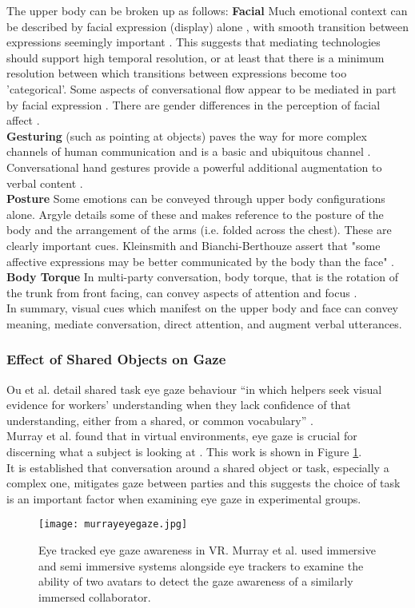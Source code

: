 The upper body can be broken up as follows:
\textbf{Facial} Much emotional context can be described by facial expression (display) alone \cite{Ekman1993, Chovil1991}, with smooth transition between expressions seemingly important \cite{schiano2004categorical}. This suggests that mediating technologies should support high temporal resolution, or at least that there is a minimum resolution between which transitions between expressions become too 'categorical'. Some aspects of conversational flow appear to be mediated in part by facial expression \cite{ohba1998facial}. There are gender differences in the perception of facial affect \cite{Hofmann20061683}.\\
\textbf{Gesturing} (such as pointing at objects) paves the way for more complex channels of human communication and is a basic and ubiquitous channel \cite{Iverson2005}.  Conversational hand gestures provide a powerful additional augmentation to verbal content \cite{Krauss1996}.\\
\textbf{Posture} Some emotions can be conveyed through upper body configurations alone. Argyle details some of these \cite{Argyle} and makes reference to the posture of the body and the arrangement of the arms (i.e. folded across the chest). These are clearly important cues. Kleinsmith and Bianchi-Berthouze assert that "some affective expressions may be better communicated by the body than the face" \cite{Kleinsmith2013}.\\
\textbf{Body Torque} In multi-party conversation, body torque, that is the rotation of the trunk from front facing, can convey aspects of attention and focus \cite{10.2307/40971262}.\\
In summary, visual cues which manifest on the upper body and face can convey meaning, mediate conversation, direct attention, and augment verbal utterances. \\
\subsubsection{Effect of Shared Objects on Gaze}
Ou et al. detail shared task eye gaze behaviour ``in which helpers seek visual evidence for workers' understanding when they lack confidence of that understanding, either from a shared, or common vocabulary'' \cite{Ou2005}.\\ 
  Murray et al. found that in virtual environments, eye gaze is crucial for discerning what a subject is looking at \cite{Murray2009a}. This work is shown in Figure \ref{fig:murrayeyegaze}.\\
It is established that conversation around a shared object or task, especially a complex one, mitigates gaze between parties \cite{Argyle1976} and this suggests the choice of task is an important factor when examining eye gaze in experimental groups. \\
\begin{figure}[!h]
\texttt{[image: murrayeyegaze.jpg]}
\caption{Eye tracked eye gaze awareness in VR. Murray et al. used immersive and semi immersive systems alongside eye trackers to examine the ability of two avatars to detect the gaze awareness of a similarly immersed collaborator.}
\label{fig:murrayeyegaze}
\end{figure}                                       
